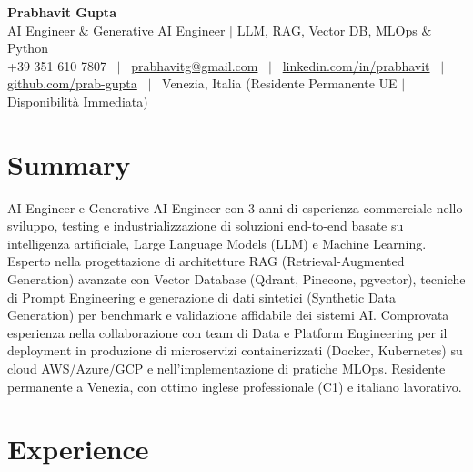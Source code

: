 \documentclass[a4paper,10pt]{article}
\begin{document}
\begin{minipage}[c]{0.80\textwidth}
  {\Huge\bfseries Prabhavit Gupta}\\[3pt]
  {\color{accent}\large AI Engineer $\&$ Generative AI Engineer $\vert$ LLM, RAG, Vector DB, MLOps $\&$ Python}\\[6pt]
  {\footnotesize +39 351 610 7807 ~$\vert$~
  \href{mailto:prabhavitg@gmail.com}{prabhavitg@gmail.com} ~$\vert$~
  \href{https://www.linkedin.com/in/prabhavit/}{linkedin.com/in/prabhavit} ~$\vert$~
  \href{https://github.com/prab-gupta}{github.com/prab-gupta} ~$\vert$~
  Venezia, Italia (Residente Permanente UE $\vert$ Disponibilità Immediata)}
\end{minipage}\hfill

\section{Summary}
AI Engineer e Generative AI Engineer con 3 anni di esperienza commerciale nello sviluppo, testing e industrializzazione di soluzioni end-to-end basate su intelligenza artificiale, Large Language Models (LLM) e Machine Learning. Esperto nella progettazione di architetture RAG (Retrieval-Augmented Generation) avanzate con Vector Database (Qdrant, Pinecone, pgvector), tecniche di Prompt Engineering e generazione di dati sintetici (Synthetic Data Generation) per benchmark e validazione affidabile dei sistemi AI. Comprovata esperienza nella collaborazione con team di Data e Platform Engineering per il deployment in produzione di microservizi containerizzati (Docker, Kubernetes) su cloud AWS/Azure/GCP e nell'implementazione di pratiche MLOps. Residente permanente a Venezia, con ottimo inglese professionale (C1) e italiano lavorativo.

\section{Experience}
\end{document}
